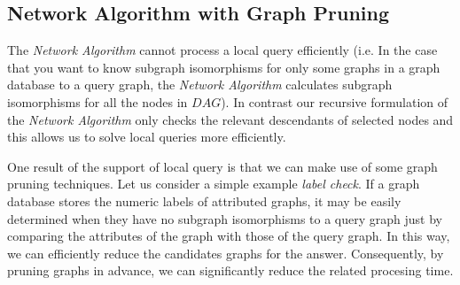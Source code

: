 \subsection{Network Algorithm with Graph Pruning}
The \textit{Network Algorithm} cannot process a local query efficiently (i.e. In the case that you want to know subgraph isomorphisms for only some graphs in a 
graph database to a query graph, the \textit{Network Algorithm} calculates subgraph isomorphisms for all the nodes in $DAG$).
In contrast our recursive formulation of the \textit{Network Algorithm} only checks the relevant descendants of selected nodes and this allows us to solve 
local queries more efficiently.

One result of the support of local query is that we can make use of some graph pruning techniques. Let us consider a simple example \textit{label check}. 
If a graph database stores the numeric labels of attributed graphs, it may be easily determined when they have no subgraph isomorphisms to 
a query graph just by comparing the attributes of the graph with those of the query graph.
In this way, we can efficiently reduce the candidates graphs for the answer.
Consequently, by pruning graphs in advance, we can significantly reduce the related procesing time.

